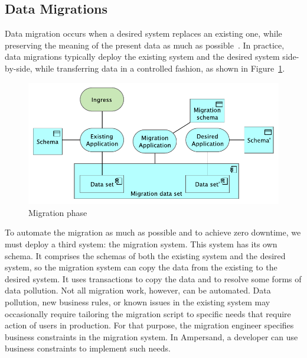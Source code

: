 \documentclass[runningheads]{llncs}
\begin{document}
\subsection{Data Migrations}
   Data migration occurs when a desired system replaces an existing one,
   while preserving the meaning of the present data as much as possible~\cite{Spivak2012}.
   In practice, data migrations typically deploy the existing system and the desired system side-by-side,
   while transferring data in a controlled fashion, as shown in Figure~\ref{fig:migration phase}.
\begin{figure}[bht]
   \begin{center}
     \includegraphics[scale=.8]{figures/migration system deployed.pdf}
   \end{center}
\caption{Migration phase}
\label{fig:migration phase}
\end{figure}
   To automate the migration as much as possible and to achieve zero downtime,
   we must deploy a third system: the migration system.
   This system has its own schema.
   It comprises the schemas of both the existing system and the desired system,
   so the migration system can copy the data from the existing to the desired system.
   It uses transactions to copy the data and to resolve some forms of data pollution.
   Not all migration work, however, can be automated.
   Data pollution, new business rules, or known issues in the existing system
   may occasionally require tailoring the migration script to specific needs
   that require action of users in production.
   For that purpose, the migration engineer specifies business constraints in the migration system.
   In Ampersand, a developer can use business constraints to implement such needs.
\end{document}
